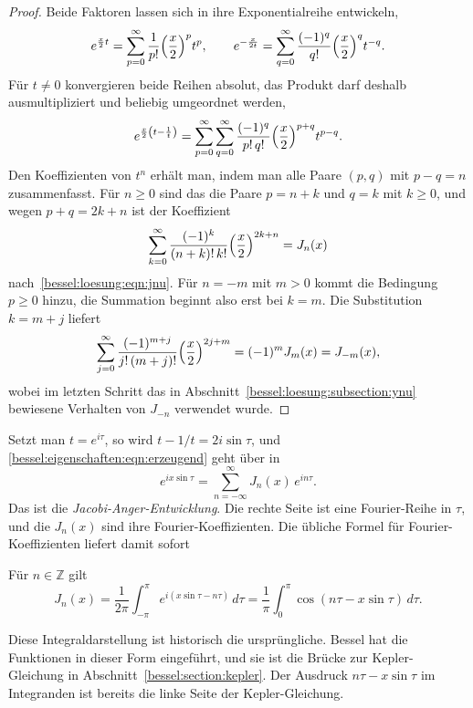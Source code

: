 \begin{proof}
Beide Faktoren lassen sich in ihre Exponentialreihe entwickeln,
\[
e^{\frac{x}{2}t}
=
\sum_{p=0}^\infty
\frac{1}{p!}
\Bigl(\frac{x}{2}\Bigr)^{p} t^{p},
\qquad
e^{-\frac{x}{2t}}
=
\sum_{q=0}^\infty
\frac{(-1)^q}{q!}
\Bigl(\frac{x}{2}\Bigr)^{q} t^{-q}.
\]
Für $t\ne 0$ konvergieren beide Reihen absolut, das Produkt darf deshalb ausmultipliziert und beliebig umgeordnet werden,
\[
e^{\frac{x}{2}\left(t-\frac{1}{t}\right)}
=
\sum_{p=0}^\infty
\sum_{q=0}^\infty
\frac{(-1)^q}{p!\,q!}
\Bigl(\frac{x}{2}\Bigr)^{p+q}
t^{p-q}.
\]
Den Koeffizienten von $t^n$ erhält man, indem man alle Paare $(p,q)$ mit $p-q=n$ zusammenfasst.
Für $n\ge 0$ sind das die Paare $p=n+k$ und $q=k$ mit $k\ge 0$, und wegen $p+q=2k+n$ ist der Koeffizient
\[
\sum_{k=0}^\infty
\frac{(-1)^k}{(n+k)!\,k!}
\Bigl(\frac{x}{2}\Bigr)^{2k+n}
=
J_n(x)
\]
nach~\eqref{bessel:loesung:eqn:jnu}.
Für $n=-m$ mit $m>0$ kommt die Bedingung $p\ge 0$ hinzu, die Summation beginnt also erst bei $k=m$.
Die Substitution $k=m+j$ liefert
\[
\sum_{j=0}^\infty
\frac{(-1)^{m+j}}{j!\,(m+j)!}
\Bigl(\frac{x}{2}\Bigr)^{2j+m}
=
(-1)^m J_m(x)
=
J_{-m}(x),
\]
wobei im letzten Schritt das in Abschnitt~\ref{bessel:loesung:subsection:ynu} bewiesene Verhalten von $J_{-n}$ verwendet wurde.
\end{proof}
 
Setzt man $t=e^{i\tau}$, so wird $t-1/t = 2i\sin\tau$, und \eqref{bessel:eigenschaften:eqn:erzeugend} geht über in
\begin{equation}
e^{ix\sin\tau}
=
\sum_{n=-\infty}^{\infty}
J_n(x)\, e^{in\tau}.
\label{bessel:eigenschaften:eqn:jacobianger}
\end{equation}
Das ist die \emph{Jacobi-Anger-Entwicklung}.
%
Die rechte Seite ist eine Fourier-Reihe in $\tau$, und die $J_n(x)$ sind ihre Fourier-Koeffizienten.
Die übliche Formel für Fourier-Koeffizienten liefert damit sofort
 
\begin{korollar}
\label{bessel:eigenschaften:korollar:integral}
Für $n\in\mathbb{Z}$ gilt
\begin{equation}
J_n(x)
=
\frac{1}{2\pi}
\int_{-\pi}^{\pi}
e^{i(x\sin\tau - n\tau)}\,d\tau
=
\frac{1}{\pi}
\int_0^{\pi}
\cos(n\tau - x\sin\tau)\,d\tau.
\label{bessel:eigenschaften:eqn:integral}
\end{equation}
\end{korollar}
 
Diese Integraldarstellung ist historisch die ursprüngliche.
Bessel hat die Funktionen in dieser Form eingeführt, und sie ist die Brücke zur Kepler-Gleichung in Abschnitt~\ref{bessel:section:kepler}.
Der Ausdruck $n\tau - x\sin\tau$ im Integranden ist bereits die linke Seite der Kepler-Gleichung.
 
